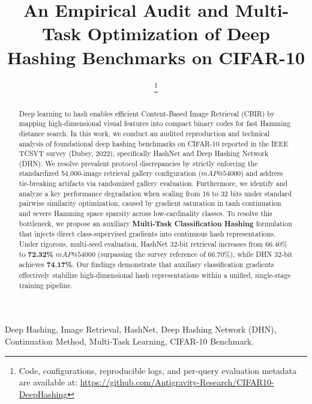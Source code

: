 \documentclass[10pt,conference]{IEEEtran}
\begin{document}
\title{An Empirical Audit and Multi-Task Optimization of Deep Hashing Benchmarks on CIFAR-10}

\author{
\thanks{Code, configurations, reproducible logs, and per-query evaluation metadata are available at: \url{https://github.com/Antigravity-Research/CIFAR10-DeepHashing}}
}

\maketitle

\begin{abstract}
Deep learning to hash enables efficient Content-Based Image Retrieval (CBIR) by mapping high-dimensional visual features into compact binary codes for fast Hamming distance search. In this work, we conduct an audited reproduction and technical analysis of foundational deep hashing benchmarks on CIFAR-10 reported in the IEEE TCSVT survey (Dubey, 2022), specifically HashNet and Deep Hashing Network (DHN). We resolve prevalent protocol discrepancies by strictly enforcing the standardized 54,000-image retrieval gallery configuration ($mAP@54000$) and address tie-breaking artifacts via randomized gallery evaluation. Furthermore, we identify and analyze a key performance degradation when scaling from 16 to 32 bits under standard pairwise similarity optimization, caused by gradient saturation in tanh continuation and severe Hamming space sparsity across low-cardinality classes. To resolve this bottleneck, we propose an auxiliary \textbf{Multi-Task Classification Hashing} formulation that injects direct class-supervised gradients into continuous hash representations. Under rigorous, multi-seed evaluation, HashNet 32-bit retrieval increases from 66.40\% to \textbf{72.32\%} $mAP@54000$ (surpassing the survey reference of 66.70\%), while DHN 32-bit achieves \textbf{74.17\%}. Our findings demonstrate that auxiliary classification gradients effectively stabilize high-dimensional hash representations within a unified, single-stage training pipeline.
\end{abstract}

\begin{IEEEkeywords}
Deep Hashing, Image Retrieval, HashNet, Deep Hashing Network (DHN), Continuation Method, Multi-Task Learning, CIFAR-10 Benchmark.
\end{IEEEkeywords}
\end{document}
